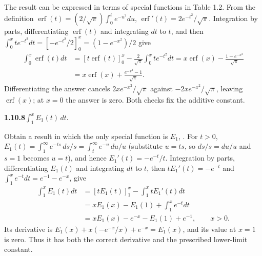 The result can be expressed in terms of special functions in Table 1.2.
\solution
From the definition
$\operatorname{erf}(t)=(2/\sqrt\pi)\int_0^te^{-u^2}du$,
$\operatorname{erf}'(t)=2e^{-t^2}/\sqrt\pi$. Integration by parts,
differentiating $\operatorname{erf}(t)$ and integrating $dt$ to $t$, and
then
$\int_0^xte^{-t^2}dt=[-e^{-t^2}/2]_0^x=(1-e^{-x^2})/2$ give
\[
 \begin{aligned}
 \int_0^x\operatorname{erf}(t)dt
 &=[t\operatorname{erf}(t)]_0^x
   -\frac2{\sqrt\pi}\int_0^x t e^{-t^2}dt
 =x\operatorname{erf}(x)-\frac{1-e^{-x^2}}{\sqrt\pi}\\
 &=\boxed{x\operatorname{erf}(x)+\frac{e^{-x^2}-1}{\sqrt\pi}}.
 \end{aligned}
\]
Differentiating the answer cancels $2xe^{-x^2}/\sqrt\pi$ against
$-2xe^{-x^2}/\sqrt\pi$, leaving $\operatorname{erf}(x)$;
at $x=0$ the answer is zero. Both checks fix the additive constant.


\par\bigskip
\noindent\textbf{1.10.8}\quad $\displaystyle\int_{1}^{x}E_{1}(t)\,dt$.

Obtain a result in which the only special function is $E_{1}$, .
\solution
{}
For $t>0$, $E_1(t)=\int_1^\infty e^{-ts}\,ds/s=\int_t^\infty e^{-u}\,du/u$
(substitute $u=ts$, so $ds/s=du/u$ and $s=1$ becomes $u=t$), and hence
$E_1'(t)=-e^{-t}/t$. Integration by parts, differentiating $E_1(t)$
and integrating $dt$ to $t$, then $tE_1'(t)=-e^{-t}$ and
$\int_1^xe^{-t}dt=e^{-1}-e^{-x}$, give
\[
 \begin{aligned}
 \int_1^x E_1(t)dt
 &=[tE_1(t)]_1^x-\int_1^x tE_1'(t)dt\\
 &=xE_1(x)-E_1(1)+\int_1^x e^{-t}dt\\
 &=\boxed{xE_1(x)-e^{-x}-E_1(1)+e^{-1}},\qquad x>0.
 \end{aligned}
\]
Its derivative is $E_1(x)+x(-e^{-x}/x)+e^{-x}=E_1(x)$,
and its value at $x=1$ is zero. Thus it has both the correct derivative
and the prescribed lower-limit constant.


